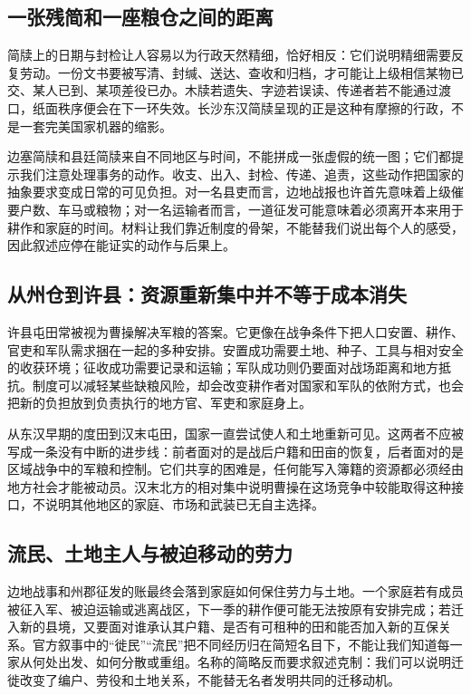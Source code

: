 \subsection{一张残简和一座粮仓之间的距离}

简牍上的日期与封检让人容易以为行政天然精细，恰好相反：它们说明精细需要反复劳动。一份文书要被写清、封缄、送达、查收和归档，才可能让上级相信某物已交、某人已到、某项差役已办。木牍若遗失、字迹若误读、传递者若不能通过渡口，纸面秩序便会在下一环失效。长沙东汉简牍呈现的正是这种有摩擦的行政，不是一套完美国家机器的缩影。

边塞简牍和县廷简牍来自不同地区与时间，不能拼成一张虚假的统一图；它们都提示我们注意处理事务的动作。收支、出入、封检、传递、追责，这些动作把国家的抽象要求变成日常的可见负担。对一名县吏而言，边地战报也许首先意味着上级催要户数、车马或粮物；对一名运输者而言，一道征发可能意味着必须离开本来用于耕作和家庭的时间。材料让我们靠近制度的骨架，不能替我们说出每个人的感受，因此叙述应停在能证实的动作与后果上。

\subsection{从州仓到许县：资源重新集中并不等于成本消失}

许县屯田常被视为曹操解决军粮的答案。它更像在战争条件下把人口安置、耕作、官吏和军队需求捆在一起的多种安排。安置成功需要土地、种子、工具与相对安全的收获环境；征收成功需要记录和运输；军队成功则仍要面对战场距离和地方抵抗。制度可以减轻某些缺粮风险，却会改变耕作者对国家和军队的依附方式，也会把新的负担放到负责执行的地方官、军吏和家庭身上。

从东汉早期的度田到汉末屯田，国家一直尝试使人和土地重新可见。这两者不应被写成一条没有中断的进步线：前者面对的是战后户籍和田亩的恢复，后者面对的是区域战争中的军粮和控制。它们共享的困难是，任何能写入簿籍的资源都必须经由地方社会才能被动员。汉末北方的相对集中说明曹操在这场竞争中较能取得这种接口，不说明其他地区的家庭、市场和武装已无自主选择。

\subsection{流民、土地主人与被迫移动的劳力}

边地战事和州郡征发的账最终会落到家庭如何保住劳力与土地。一个家庭若有成员被征入军、被迫运输或逃离战区，下一季的耕作便可能无法按原有安排完成；若迁入新的县境，又要面对谁承认其户籍、是否有可租种的田和能否加入新的互保关系。官方叙事中的“徙民”“流民”把不同经历归在简短名目下，不能让我们知道每一家从何处出发、如何分散或重组。名称的简略反而要求叙述克制：我们可以说明迁徙改变了编户、劳役和土地关系，不能替无名者发明共同的迁移动机。

